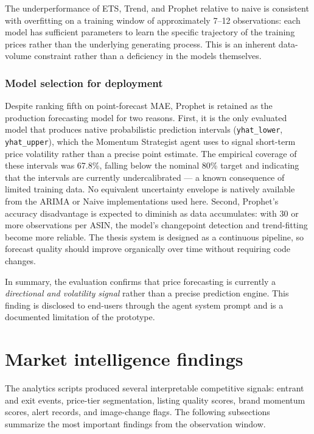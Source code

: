 The underperformance of ETS, Trend, and Prophet relative to naive is consistent with overfitting on a training window of approximately 7--12 observations: each model has sufficient parameters to learn the specific trajectory of the training prices rather than the underlying generating process. This is an inherent data-volume constraint rather than a deficiency in the models themselves.

\subsubsection*{Model selection for deployment}

Despite ranking fifth on point-forecast MAE, Prophet is retained as the production forecasting model for two reasons. First, it is the only evaluated model that produces native probabilistic prediction intervals (\texttt{yhat\_lower}, \texttt{yhat\_upper}), which the Momentum Strategist agent uses to signal short-term price volatility rather than a precise point estimate. The empirical coverage of these intervals was 67.8\%, falling below the nominal 80\% target and indicating that the intervals are currently undercalibrated --- a known consequence of limited training data. No equivalent uncertainty envelope is natively available from the ARIMA or Naive implementations used here. Second, Prophet's accuracy disadvantage is expected to diminish as data accumulates: with 30 or more observations per ASIN, the model's changepoint detection and trend-fitting become more reliable. The thesis system is designed as a continuous pipeline, so forecast quality should improve organically over time without requiring code changes.

In summary, the evaluation confirms that price forecasting is currently a \emph{directional and volatility signal} rather than a precise prediction engine. This finding is disclosed to end-users through the agent system prompt and is a documented limitation of the prototype.

\section{Market intelligence findings}

The analytics scripts produced several interpretable competitive signals: entrant and exit events, price-tier segmentation, listing quality scores, brand momentum scores, alert records, and image-change flags. The following subsections summarize the most important findings from the observation window.

